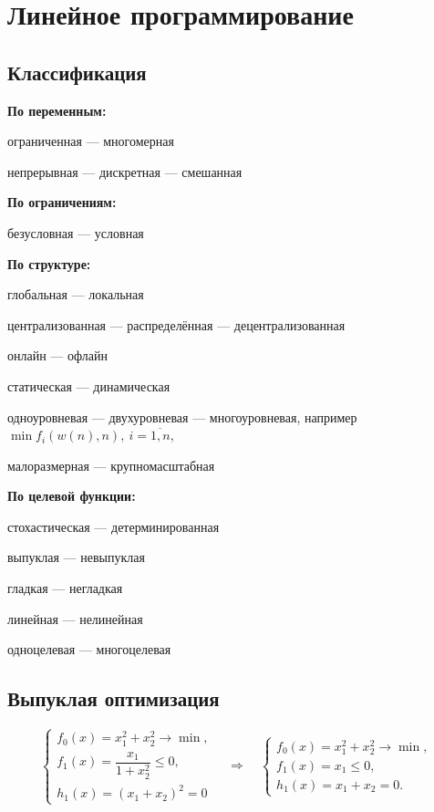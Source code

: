 \documentclass[12pt,a4paper]{article}
\begin{document}
\tableofcontents

\newpage

\section{Линейное программирование}

\subsection{Классификация}

\textbf{По переменным:}

ограниченная --- многомерная

непрерывная --- дискретная --- смешанная

\textbf{По ограничениям:}

безусловная --- условная

\textbf{По структуре:}

глобальная --- локальная

централизованная --- распределённая --- децентрализованная

онлайн --- офлайн

статическая --- динамическая

одноуровневая --- двухуровневая --- многоуровневая, например $\min f_i(w(n), n),\ i=\overline{1,n}$,

малоразмерная --- крупномасштабная

\textbf{По целевой функции:}

стохастическая --- детерминированная

выпуклая --- невыпуклая

гладкая --- негладкая

линейная --- нелинейная

одноцелевая --- многоцелевая

\subsection{Выпуклая оптимизация}

\[
\begin{cases}
f_0(x)=x_1^2+x_2^2\to\min,\\
f_1(x)=\dfrac{x_1}{1+x_2^2}\leq 0,\\
h_1(x)=(x_1+x_2)^2=0
\end{cases}
\quad\Longrightarrow\quad
\begin{cases}
f_0(x)=x_1^2+x_2^2\to\min,\\
f_1(x)=x_1\leq 0,\\
h_1(x)=x_1+x_2=0.
\end{cases}
\]
\end{document}
